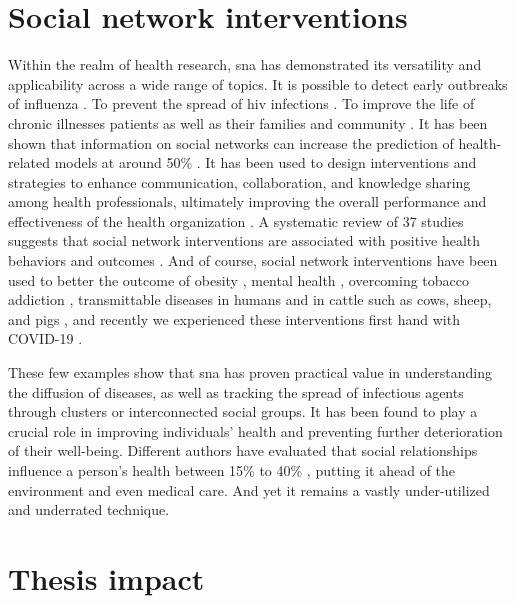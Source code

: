 \section{ Social network interventions }
\label{socialinterventions}

Within the realm of health research, \gls{sna} has demonstrated its versatility and applicability across a wide range of topics. It is possible to detect early outbreaks of influenza \cite{Christakis2010}. To prevent the spread of \gls{hiv} infections \cite{Friedman1997}. To improve the life of chronic illnesses patients as well as their families and community \cite{FernndezPea2020}. It has been shown that information on social networks can increase the prediction of health-related models at around 50\% \cite{Lin2019}. It has been used to design interventions and strategies to enhance communication, collaboration, and knowledge sharing among health professionals, ultimately improving the overall performance and effectiveness of the health organization \cite{Tasselli2014, Sabot2017}. A systematic review of 37 studies suggests that social network interventions are associated with positive health behaviors and outcomes \cite{Hunter2019}. And of course, social network interventions have been used to better the outcome of obesity \cite{Gesell2013, systems9030066, Smith2020, McGlashan2019}, mental health \cite{Pinto2005, Rosychuk2009}, overcoming tobacco addiction \cite{Latkin2015, Sadasivam2016},  transmittable diseases in humans \cite{Danon2012, Wang2011, Llupi2016, Ljubic2019} and in cattle such as cows, sheep, and pigs \cite{Marquetoux2016, OrtizPelaez2006}, and recently we experienced these interventions first hand with COVID-19 \cite{Corcoran2022, Centola2020}.

These few examples show that \gls{sna} has proven practical value in understanding the diffusion of diseases, as well as tracking the spread of infectious agents through clusters or interconnected social groups. It has been found to play a crucial role in improving individuals' health and preventing further deterioration of their well-being. Different authors have evaluated that social relationships influence a person's health between 15\% to 40\% \cite{ref:socialinfluence2014}, putting it ahead of the environment and even medical care. And yet it remains a vastly under-utilized and underrated technique.

\section{ Thesis impact }

